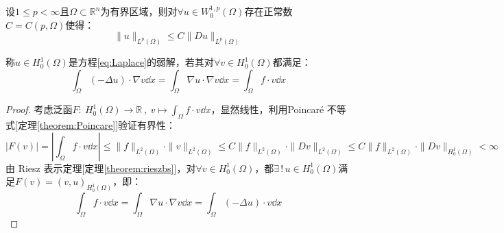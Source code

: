 \begin{theorem}\label{theorem:Poincare}
设$1\leq p<\infty$且$\Omega\subset\mathbb{R}^n$为有界区域，则对$\forall u\in W_0^{1,p}(\Omega)$存在正常数$C=C(p,\Omega)$使得：
\[\|u\|_{L^p(\Omega)}\leq C\|Du\|_{L^p(\Omega)}\]
\end{theorem}

\begin{definition}[弱解]
称$u \in H_0^1(\Omega)$是方程\eqref{eq:Laplace}的弱解，若其对$\forall v  \in H_0^1(\Omega)$都满足：
\[\int_{\Omega}(-\Delta u) \cdot \nabla v \dd{x}=\int_{\Omega}\nabla u \cdot \nabla v \dd{x}=\int_{\Omega} f \cdot v \dd{x}\]
\end{definition}

\begin{proof}
考虑泛函$F: \ H_0^1(\Omega) \to \mathbb{R} \ , \ v \mapsto \int_{\Omega}f \cdot v \dd{x}$，显然线性，利用Poincar\'{e} 不等式[定理\ref{theorem:Poincare}]验证有界性：
\[|F(v)|=\left|\int_{\Omega}f \cdot v \dd{x}\right| \leq \|f\|_{L^2(\Omega)} \cdot \|v\|_{L^2(\Omega)} \leq C\|f\|_{L^2(\Omega)} \cdot \|Dv\|_{L^2(\Omega)}\leq C\|f\|_{L^2(\Omega)} \cdot \|Dv\|_{H_0^1(\Omega)}<\infty\]
由 Riesz 表示定理[定理\ref{theorem:rieszbs}]，对$\forall v \in H_0^1(\Omega)$，都$\exists \, ! \, u \in H_0^1(\Omega)$满足$F(v)=(v,u)_{H_0^1(\Omega)}$，即：
\[\int_{\Omega} f \cdot v \dd{x}=\int_{\Omega}\nabla u \cdot \nabla v \dd{x}=\int_{\Omega}(-\Delta u) \cdot v \dd{x}\]
\end{proof}

